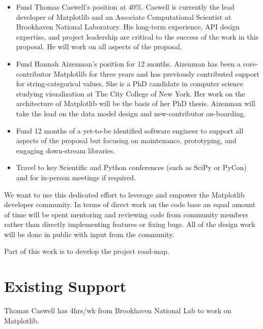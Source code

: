 \documentclass[11pt]{article}  %
\begin{document}
\begin{itemize}[noitemsep]

\item Fund Thomas Caswell's position at 40\%.  Caswell is
  currently the lead developer of Matplotlib and an Associate
  Computational Scientist at Brookhaven National Laboratory.  His
  long-term experience, API design expertise, and project leadership
  are critical to the success of the work in this proposal.  He will work
  on all aspects of the proposal.
\item Fund Hannah Aizenman's position for 12 months.  Aizenman has
  been a core-contributor Matplotlib for three years and has
  previously contributed support for string-categorical values.  She
  is a PhD candidate in computer science studying visualization at The
  City College of New York.  Her work on the architecture of
  Matplotlib will be the basis of her PhD thesis.  Aizenman will take
  the lead on the data model design and new-contributor on-boarding.
\item Fund 12 months of a yet-to-be identified software engineer to
  support all aspects of the proposal but focusing on maintenance,
  prototyping, and engaging down-stream libraries.
\item Travel to key Scientific and Python conferences (such as SciPy
  or PyCon) and for in-person meetings if required.
\end{itemize}

We want to use this dedicated effort to leverage and empower the
Matplotlib developer community.  In terms of direct work on the code
base an equal amount of time will be spent mentoring and reviewing
code from community members rather than directly implementing features
or fixing bugs.  All of the design work will be done in public with
input from the community.

Part of this work is to develop the project road-map.


\section{Existing Support}

Thomas Caswell has 4hrs/wk from Brookhaven National Lab to work on
Matplotlib.


\clearpage

\end{document}
